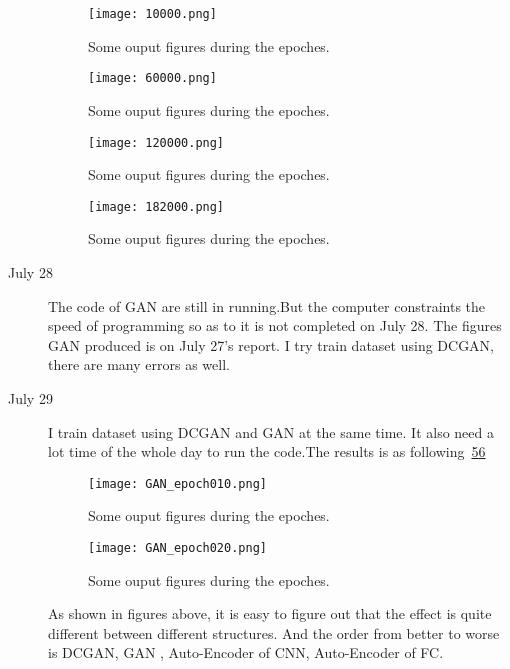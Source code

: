\documentclass[a4paper]{article}
\begin{document}
\begin{description}
\begin{figure}[!htp]
	\begin{center}
		\texttt{[image: 10000.png]}
	\end{center}
	\caption{Some ouput figures during the epoches.}
	\label{fig:10000}
\end{figure}

\begin{figure}[!htp]
	\begin{center}
		\texttt{[image: 60000.png]}
	\end{center}
	\caption{Some ouput figures during the epoches.}
	\label{fig:60000}
\end{figure}

\begin{figure}[!htp]
	\begin{center}
		\texttt{[image: 120000.png]}
	\end{center}
	\caption{Some ouput figures during the epoches.}
	\label{fig:120000}
\end{figure}

\begin{figure}[!htp]
	\begin{center}
		\texttt{[image: 182000.png]}
	\end{center}
	\caption{Some ouput figures during the epoches.}
	\label{fig:182000}
\end{figure}

\item[July 28]The code of GAN are still in running.But the computer constraints the speed of programming so as to it is not completed on July 28. The figures GAN produced is on July 27's report. I try train dataset using DCGAN, there are many errors as well.

\item[July 29]
I train dataset using DCGAN and GAN at the same time. It also need a lot time of the whole day to run the code.The results is as following~\ref{fig:GAN_epoch010}\ref{fig:GAN_epoch020}

\begin{figure}[!htp]
	\begin{center}
		\texttt{[image: GAN\_epoch010.png]}
	\end{center}
	\caption{Some ouput figures during the epoches.}
	\label{fig:GAN_epoch010}
\end{figure}

\begin{figure}[!htp]
	\begin{center}
		\texttt{[image: GAN\_epoch020.png]}
	\end{center}
	\caption{Some ouput figures during the epoches.}
	\label{fig:GAN_epoch020}
\end{figure}

As shown in figures above, it is easy to figure out that the effect is quite different between different structures. And the order from better to worse is DCGAN, GAN , Auto-Encoder of CNN, Auto-Encoder of FC.

\end{description}
\end{document}

